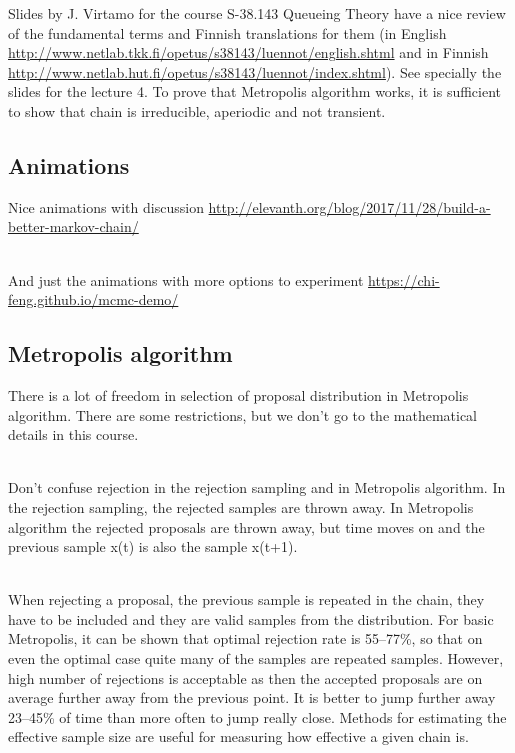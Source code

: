 \documentclass[a4paper,11pt,english]{article}
\begin{document}
Slides by J. Virtamo for the course S-38.143 Queueing Theory have a nice
review of the fundamental terms and Finnish translations for them (in
English
\url{http://www.netlab.tkk.fi/opetus/s38143/luennot/english.shtml} and
in Finnish
\url{http://www.netlab.hut.fi/opetus/s38143/luennot/index.shtml}). See
specially the slides for the lecture 4. To prove that Metropolis
algorithm works, it is sufficient to show that chain is irreducible,
aperiodic and not transient.

\subsection*{Animations}

Nice animations with discussion
\url{http://elevanth.org/blog/2017/11/28/build-a-better-markov-chain/}

~\\
And just the animations with more options to experiment
\url{https://chi-feng.github.io/mcmc-demo/}

\subsection*{Metropolis algorithm}

There is a lot of freedom in selection of proposal distribution in
Metropolis algorithm. There are some restrictions, but we don't go to
the mathematical details in this course.

~\\
Don't confuse rejection in the rejection sampling and in Metropolis
algorithm. In the rejection sampling, the rejected samples are thrown
away. In Metropolis algorithm the rejected proposals are thrown away,
but time moves on and the previous sample x(t) is also the sample
x(t+1).

~\\
When rejecting a proposal, the previous sample is repeated in the
chain, they have to be included and they are valid samples from the
distribution. For basic Metropolis, it can be shown that optimal
rejection rate is 55--77\%, so that on even the optimal case quite many
of the samples are repeated samples. However, high number of
rejections is acceptable as then the accepted proposals are on average
further away from the previous point. It is better to jump further
away 23--45\% of time than more often to jump really close. Methods for
estimating the effective sample size are useful for measuring how
effective a given chain is.
\end{document}

